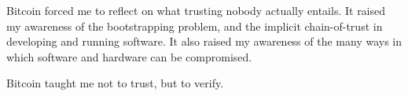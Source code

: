 Bitcoin forced me to reflect on what trusting nobody actually entails.
It raised my awareness of the bootstrapping problem, and the implicit
chain-of-trust in developing and running software. It also raised my
awareness of the many ways in which software and hardware can be
compromised.

Bitcoin taught me not to trust, but to verify.

%
%
%
%

